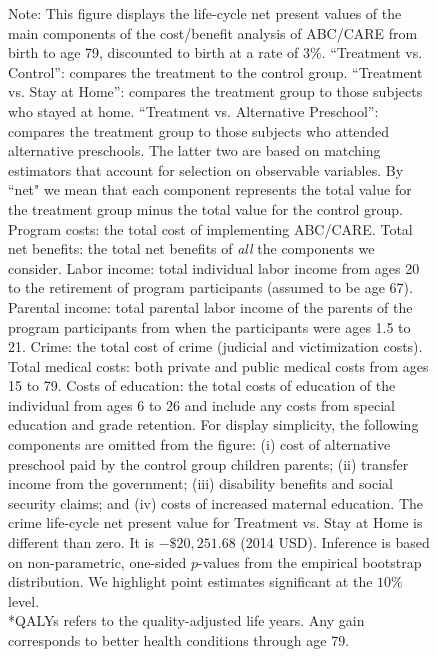 \begin{figure}
{Note: This figure displays the life-cycle net present values of the main components of the cost/benefit analysis of ABC/CARE from birth to age 79, discounted to birth at a rate of 3\%. ``Treatment vs. Control'': compares the treatment to the control group. ``Treatment vs. Stay at Home'': compares the treatment group to those subjects who stayed at home. ``Treatment vs. Alternative Preschool'': compares the treatment group to those subjects who attended alternative preschools. The latter two are based on matching estimators that account for selection on observable variables. By ``net" we mean that each component represents the total value for the treatment group minus the total value for the control group. Program costs: the total cost of implementing ABC/CARE. Total net benefits: the total net benefits of \textit{all} the components we consider. Labor income: total individual labor income from ages 20 to the retirement of program participants  (assumed to be age 67). Parental income: total parental labor income of the parents of the program participants from when the participants were ages 1.5 to 21. Crime: the total cost of crime (judicial and victimization costs). Total medical costs: both private and public medical costs from ages 15 to 79. Costs of education: the total costs of education of the individual from ages 6 to 26 and include any costs from special education and grade retention. For display simplicity, the following components are omitted from the figure: (i) cost of alternative preschool paid by the control group children parents; (ii) transfer income from the government; (iii) disability benefits and social security claims; and (iv) costs of increased maternal education. The crime life-cycle net present value for Treatment vs. Stay at Home is different than zero. It is $-\$20,251.68$ (2014 USD). Inference is based on non-parametric, one-sided $p$-values from the empirical bootstrap distribution. We highlight point estimates significant at the $10\%$ level.\\
*QALYs refers to the quality-adjusted life years. Any gain corresponds to better health conditions through age 79.\\
}
\end{figure}

